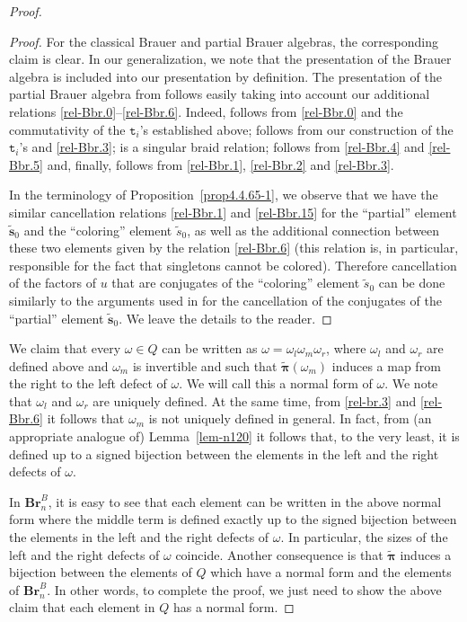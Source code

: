 \documentclass[a4paper]{amsart}
\begin{document}
\begin{proof}
\begin{proof}
For the classical Brauer and partial Brauer algebras, 
the corresponding claim is clear. In our generalization, we note that
the presentation of the Brauer algebra is included
into our presentation by definition. The presentation of the 
partial Brauer algebra from \cite[Section~5]{KuMaz}
follows easily taking into account our additional relations 
\eqref{rel-Bbr.0}--\eqref{rel-Bbr.6}. Indeed, 
\cite[(15)]{KuMaz} follows from \eqref{rel-Bbr.0}
and the commutativity of the $\mathtt{t}_{i}$'s
established above; \cite[(16)]{KuMaz} follows from
our construction of the $\mathtt{t}_{i}$'s 
and \eqref{rel-Bbr.3}; \cite[(17)]{KuMaz} is a singular
braid relation; \cite[(18)]{KuMaz} follows from
\eqref{rel-Bbr.4} and \eqref{rel-Bbr.5} and, finally,
\cite[(19)]{KuMaz} follows from \eqref{rel-Bbr.1},
\eqref{rel-Bbr.2} and \eqref{rel-Bbr.3}.

In the terminology of Proposition~\ref{prop4.4.65-1},
we observe that we have  the similar cancellation relations \eqref{rel-Bbr.1} 
and \eqref{rel-Bbr.15} for the ``partial'' element $\tilde{\mathbf{s}}_0$ 
and the ``coloring'' element $\tilde{s}_0$, as well as the 
additional connection between these two elements 
given by the relation \eqref{rel-Bbr.6}
(this relation is, in particular, responsible for the fact that
singletons cannot be colored). Therefore cancellation of 
the factors of $u$ that are conjugates of the ``coloring'' 
element $\tilde{s}_0$ can be done similarly to the arguments
used in \cite[Section~5]{KuMaz} for the cancellation of the
conjugates of the ``partial'' element $\tilde{\mathbf{s}}_0$.
We leave the details to the reader.
\end{proof}

We claim that every $\omega\in Q$ can be written as
$\omega=\omega_l\omega_m\omega_r$, where
$\omega_l$ and $\omega_r$ are defined above
and $\omega_m$ is invertible and such that 
$\tilde{\boldsymbol{\pi}}(\omega_m)$ induces
a map from the right to the left defect of $\omega$.
We will call this a normal form of $\omega$.
We note that $\omega_l$ and $\omega_r$ are 
uniquely defined. At the same time, from
\eqref{rel-br.3} and  \eqref{rel-Bbr.6} it follows
that $\omega_m$ is not uniquely defined in general.
In fact, from (an appropriate analogue of) 
Lemma~\ref{lem-n120} it follows
that, to the very least, it is defined up to
a signed bijection between the elements in the
left and the right defects of $\omega$.

In $\mathbf{Br}_n^B$, it is easy to see that 
each element can be written
in the above normal form where the middle term
is defined exactly up to the signed 
bijection between the elements in the
left and the right defects of  $\omega$.
In particular, the sizes of the left 
and the right defects of $\omega$ coincide.
Another consequence is that $\tilde{\boldsymbol{\pi}}$ induces
a bijection between the elements of $Q$ which 
have a normal form and the elements of $\mathbf{Br}_n^B$.
In other words, to complete the proof, we just need
to show the above claim that each element in $Q$
has a normal form.


\end{proof}
\end{document}
